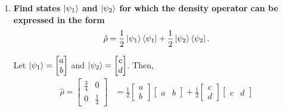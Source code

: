 \documentclass[11pt]{article}
\DeclareMathOperator{\tr}{tr}
\begin{document}
\begin{enumerate}[label=\textbf{\arabic*.}, start=2]
{\begin{enumerate}[label=\textbf{(\alph*)}]
{\begin{align*}
                        \Aboxed{\langle S_y\rangle&=0\hbar}
                    \end{align*}
                    And finally for the \(S_z\) operator:
                    \begin{align*}
                        \bra{\psi}S_z\ket{\psi}&=\tr(S_z\hat\rho) \\
                        &=\tr\left(\frac{\hbar}{2}\begin{bmatrix}1 & 0 \\ 0 & -1\end{bmatrix}\begin{bmatrix}\frac 3 4 & 0 \\ 0 & \frac 1 4\end{bmatrix}\right) \\
                        &=\frac{\hbar}{2}\tr\left(\begin{bmatrix}\frac 3 4 & 0 \\ 0 & -\frac 1 4\end{bmatrix}\right) \\
                        &=\frac{\hbar}{2}\frac 1 2 \\
                        \Aboxed{\langle S_z\rangle&=\frac{1}{4}\hbar}
                    \end{align*}
                }
                \item{
                    \textbf{\boldmath Find states \(\ket{\psi_1}\) and \(\ket{\psi_2}\) for which the density operator can be expressed in the form \[\hat\rho=\frac 1 2\ket{\psi_1}\bra{\psi_1}+\frac 1 2 \ket{\psi_2}\bra{\psi_2}.\]}
                    \par
                    Let \(\ket{\psi_1}=\begin{bmatrix}a \\ b\end{bmatrix}\) and \(\ket{\psi_2}=\begin{bmatrix}c \\ d\end{bmatrix}\). Then,
                    \begin{align*}
                        \hat\rho=\begin{bmatrix}\frac 3 4 & 0 \\ 0 & \frac 1 4\end{bmatrix}&=\frac 1 2 \begin{bmatrix}a \\ b\end{bmatrix}\begin{bmatrix}a & b\end{bmatrix}+\frac 1 2 \begin{bmatrix}c \\ d\end{bmatrix}\begin{bmatrix}c & d\end{bmatrix} \\

\end{align*}}
\end{enumerate}}
\end{enumerate}
\end{document}
